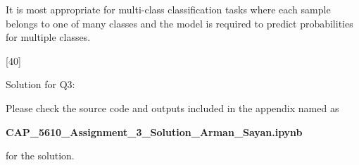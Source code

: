 \documentclass[12pt,letterpaper, onecolumn]{exam}
\begin{document}
\begin{questions}
\begin{parts}
\begin{solution}
\begin{enumerate}[label=(\alph*)]
                It is most appropriate for multi-class classification tasks where each sample belongs to one of many classes and the model is required to predict probabilities for multiple classes.

            \end{enumerate}

        \end{solution}
        
    \end{parts}

    \pagebreak

    [40]

    Solution for Q3:

    \begin{solution}

        Please check the source code and outputs included in the appendix named as

        \begin{center}
            \textbf{CAP\_5610\_Assignment\_3\_Solution\_Arman\_Sayan.ipynb}
        \end{center}
        
        for the solution.
    \end{solution}

    \pagebreak
    
\end{questions}

%      
\end{document}
